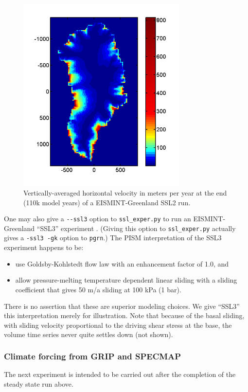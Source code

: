\documentclass[11pt,final]{amsart}
\begin{document}
\begin{figure}[ht]
\includegraphics[height=3.9in,keepaspectratio=true]{figs/greencbar_SSL2}
\caption{Vertically-averaged horizontal velocity in meters per year at the end (110k model years) of a EISMINT-Greenland SSL2 run.}
\label{fig:ssl2cbar}
\end{figure}

One may also give a \verb|--ssl3| option to \verb|ssl_exper.py| to run an EISMINT-Greenland ``SSL3'' experiment \cite{RitzEISMINT}.  (Giving this option to \verb|ssl_exper.py| actually gives a \verb|-ssl3 -gk| option to \verb|pgrn|.)  The PISM interpretation of the SSL3 experiment happens to be: \begin{itemize}
\item use Goldsby-Kohlstedt flow law \cite{GoldsbyKohlstedt} with an enhancement factor of 1.0, and
\item allow pressure-melting temperature dependent linear sliding with a sliding coefficient that gives 50 m/a sliding at 100 kPa (1 bar).
\end{itemize}
There is no assertion that these are superior modeling choices.  We give ``SSL3'' this interpretation merely for illustration.  Note that because of the basal sliding, with sliding velocity proportional to the driving shear stress at the base, the volume time series never quite settles down (not shown).

\subsubsection*{Climate forcing from GRIP and SPECMAP}  The next experiment is intended to be carried out after the completion of the steady state run above.
\end{document}
